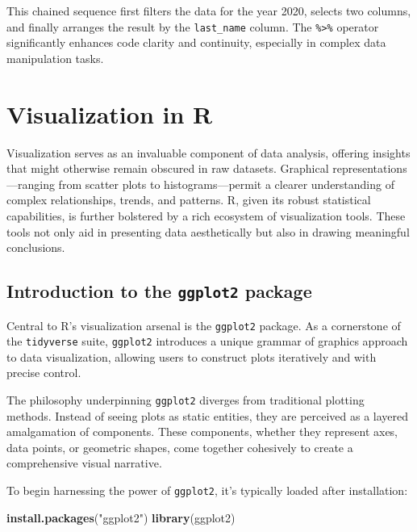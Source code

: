 \documentclass[
  b5paper]{book}
\newenvironment{Shaded}{\begin{snugshade}}{\end{snugshade}}
\newcommand{\FunctionTok}[1]{\textcolor[rgb]{0.13,0.29,0.53}{\textbf{#1}}}
\newcommand{\NormalTok}[1]{#1}
\newcommand{\StringTok}[1]{\textcolor[rgb]{0.31,0.60,0.02}{#1}}
\begin{document}
This chained sequence first filters the data for the year 2020, selects two columns, and finally arranges the result by the \texttt{last\_name} column. The \texttt{\%\textgreater{}\%} operator significantly enhances code clarity and continuity, especially in complex data manipulation tasks.

\hypertarget{visualization-in-r}{%
\section{Visualization in R}\label{visualization-in-r}}

Visualization serves as an invaluable component of data analysis, offering insights that might otherwise remain obscured in raw datasets. Graphical representations---ranging from scatter plots to histograms---permit a clearer understanding of complex relationships, trends, and patterns. R, given its robust statistical capabilities, is further bolstered by a rich ecosystem of visualization tools. These tools not only aid in presenting data aesthetically but also in drawing meaningful conclusions.

\hypertarget{introduction-to-the-ggplot2-package}{%
\subsection*{\texorpdfstring{Introduction to the \textbf{\texttt{ggplot2}} package}{Introduction to the ggplot2 package}}\label{introduction-to-the-ggplot2-package}}

Central to R's visualization arsenal is the \texttt{ggplot2} package. As a cornerstone of the \texttt{tidyverse} suite, \texttt{ggplot2} introduces a unique grammar of graphics approach to data visualization, allowing users to construct plots iteratively and with precise control.

The philosophy underpinning \texttt{ggplot2} diverges from traditional plotting methods. Instead of seeing plots as static entities, they are perceived as a layered amalgamation of components. These components, whether they represent axes, data points, or geometric shapes, come together cohesively to create a comprehensive visual narrative.

To begin harnessing the power of \texttt{ggplot2}, it's typically loaded after installation:

\begin{Shaded}
\begin{Highlighting}[]
\FunctionTok{install.packages}\NormalTok{(}\StringTok{"ggplot2"}\NormalTok{)}
\FunctionTok{library}\NormalTok{(ggplot2)}
\end{Highlighting}
\end{Shaded}
\end{document}
